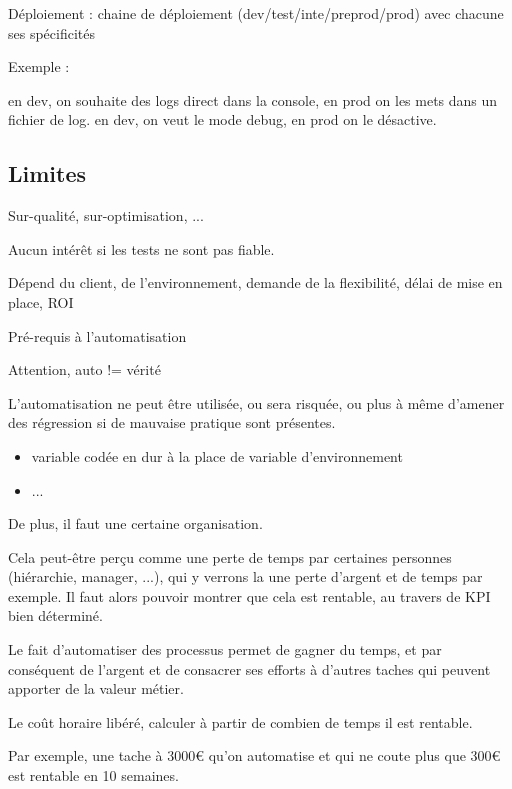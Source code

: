 Déploiement : chaine de déploiement (dev/test/inte/preprod/prod) avec chacune ses spécificités

Exemple :

en dev, on souhaite des logs direct dans la console, en prod on les mets dans un fichier de log.
en dev, on veut le mode debug, en prod on le désactive.

\subsection*{Limites}



Sur-qualité, sur-optimisation, ...

Aucun intérêt si les tests ne sont pas fiable.

Dépend du client, de l'environnement, demande de la flexibilité, délai de mise en place, ROI

Pré-requis à l'automatisation

Attention, auto != vérité 

L'automatisation ne peut être utilisée, ou sera risquée, ou plus à même d'amener des régression si de mauvaise pratique sont présentes.

\begin{itemize}
	\item variable codée en dur à la place de variable d'environnement
	\item ...
\end{itemize}

De plus, il faut une certaine organisation.

Cela peut-être perçu comme une perte de temps par certaines personnes (hiérarchie, manager, ...), qui y verrons la une perte d'argent et de temps par exemple. Il faut alors pouvoir montrer que cela est rentable, au travers de \gls{KPI} bien déterminé.

Le fait d'automatiser des processus permet de gagner du temps, et par conséquent de l'argent et de consacrer ses efforts à d'autres taches qui peuvent apporter de la valeur métier.

Le coût horaire libéré, calculer à partir de combien de temps il est rentable.

Par exemple, une tache à 3000€ qu'on automatise et qui ne coute plus que 300€ est rentable en 10 semaines.

